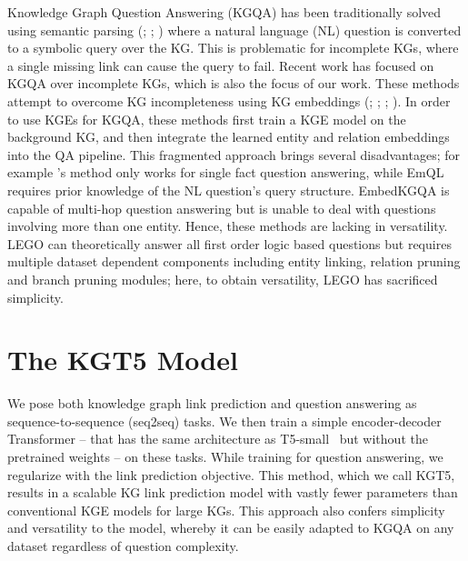 \documentclass[11pt]{article}
\renewcommand\:{\colon} \newcommand{\sset}[1]{\left\{\,#1\,\right\}} \newcommand{\ssets}[1]{\left\{#1\right\}} \newcommand{\ssetn}[1]{\{\,#1\,\}}
\newcommand{\method}{\textsc{KGT5}}
\begin{document}
Knowledge Graph Question Answering (KGQA) has been traditionally solved using semantic parsing  (\citealt{Berant2013SemanticPO}; \citealt{bast2015}; \citealt{das2021casebased}) where a natural language (NL) question is converted to a symbolic query over the KG. This is problematic for incomplete KGs, where a single missing link can cause the query to fail.
Recent work has focused on KGQA over incomplete KGs, which is also the focus of our work. These methods attempt to overcome KG incompleteness using KG embeddings (\citealt{huang2019knowledge}; \citealt{saxena2020improving}; \citealt{sun2021faithful}; \citealt{ren2021lego}). In order to use KGEs for KGQA, these methods first train a KGE model on the background KG, and then integrate the learned entity and relation embeddings into the QA pipeline. This fragmented approach brings several disadvantages;
for example \citet{huang2019knowledge}'s method only works for single fact question answering, while EmQL \cite{sun2021faithful} requires prior knowledge of the NL question's query structure. EmbedKGQA \cite{saxena2020improving} is capable of multi-hop question answering but is unable to deal with questions involving more than one entity. Hence, these methods are lacking in versatility. LEGO \cite{ren2021lego} can theoretically answer all first order logic based questions but requires multiple dataset dependent components including entity linking, relation pruning and branch pruning modules; here, to obtain versatility, LEGO has sacrificed simplicity.





\section{The \method{} Model}
\label{sec:model}




We pose both knowledge graph link prediction and question answering as sequence-to-sequence (seq2seq) tasks. We then train a simple encoder-decoder Transformer -- that has the same architecture as T5-small~\cite{raffel2020exploring} but without the pretrained weights -- on these tasks. While training for question answering, we regularize with the link prediction objective. This method, which we call \method{}, results in a scalable KG link prediction model with vastly fewer parameters than conventional KGE models for large KGs. 
This approach also confers simplicity and versatility to the model, whereby it can be easily adapted to KGQA on any dataset regardless of question complexity.
\end{document}

